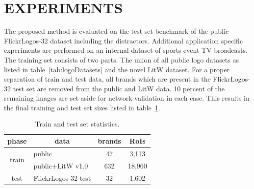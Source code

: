 \documentclass[a4paper,twoside]{article}
\begin{document}
\section{\uppercase{Experiments}}
%
\noindent The proposed method is evaluated on the test set benchmark of the public FlickrLogos-32 dataset including the distractors. Additional application specific experiments are performed on an internal dataset of sports event TV broadcasts. 
The training set consists of two parts. The union of all public logo datasets as listed in table~\ref{tab:logoDatasets} and the novel \ac{LitW} dataset. For a proper separation of train and test data, all brands which are present in the FlickrLogos-32 test set are removed from the public and \ac{LitW} data. 10 percent of the remaining images are set aside for network validation in each case. This results in the final training and test set sizes listed in table~\ref{tab:trainTestStatistics}.
%
\begin{table}[t]
\centering
\begingroup	
\setlength{\tabcolsep}{6pt}
\caption{Train and test set statistics.}
\label{tab:trainTestStatistics}
\begin{small}
\begin{tabular}{cl|cc}
\textbf{phase} & \multicolumn{1}{c|}{\textbf{data}} & \multicolumn{1}{c}{\textbf{brands}} & \multicolumn{1}{c}{\textbf{RoIs}} \bigstrut[b]\\
\hline
\multirow{2}[2]{*}{train} & public & 47    & 3,113 \bigstrut[t]\\
      & public+\ac{LitW} v1.0 & 632   & 18,960 \bigstrut[b]\\
\hline
test  & FlickrLogos-32 test & 32    & 1,602 \bigstrut[t]\\
\end{tabular}%
\end{small}
\endgroup
\end{table}
\end{document}
